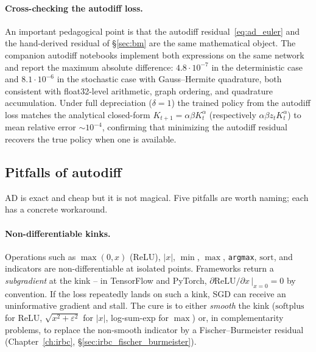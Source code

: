 \documentclass[11pt,a4paper]{report}
\begin{document}
\paragraph{Cross-checking the autodiff loss.}  An important pedagogical point is that the autodiff residual~\eqref{eq:ad_euler} and the hand-derived residual of \S\ref{sec:bm} are the same mathematical object.  The companion autodiff notebooks implement both expressions on the same network and report the maximum absolute difference: $4.8\cdot 10^{-7}$ in the deterministic case and $8.1\cdot 10^{-6}$ in the stochastic case with Gauss--Hermite quadrature, both consistent with float32-level arithmetic, graph ordering, and quadrature accumulation.  Under full depreciation ($\delta = 1$) the trained policy from the autodiff loss matches the analytical closed-form $K_{t+1} = \alpha\beta K_t^{\alpha}$ (respectively $\alpha\beta z_t K_t^{\alpha}$) to mean relative error $\sim 10^{-4}$, confirming that minimizing the autodiff residual recovers the true policy when one is available.

\subsection{Pitfalls of autodiff}
\label{sec:ad_pitfalls}

AD is exact and cheap but it is not magical.  Five pitfalls are worth naming; each has a concrete workaround.

\paragraph{Non-differentiable kinks.}  Operations such as $\max(0,x)$ (ReLU), $|x|$, $\min$, $\max$, \texttt{argmax}, $\mathrm{sort}$, and indicators are non-differentiable at isolated points.  Frameworks return a \emph{subgradient} at the kink -- in TensorFlow and PyTorch, $\partial \mathrm{ReLU}/\partial x\,|_{x=0} = 0$ by convention.  If the loss repeatedly lands on such a kink, SGD can receive an uninformative gradient and stall.  The cure is to either \emph{smooth} the kink ($\mathrm{softplus}$ for ReLU, $\sqrt{x^2 + \varepsilon^2}$ for $|x|$, log-sum-exp for $\max$) or, in complementarity problems, to replace the non-smooth indicator by a Fischer--Burmeister residual (Chapter~\ref{ch:irbc}, \S\ref{sec:irbc_fischer_burmeister}).
\end{document}
